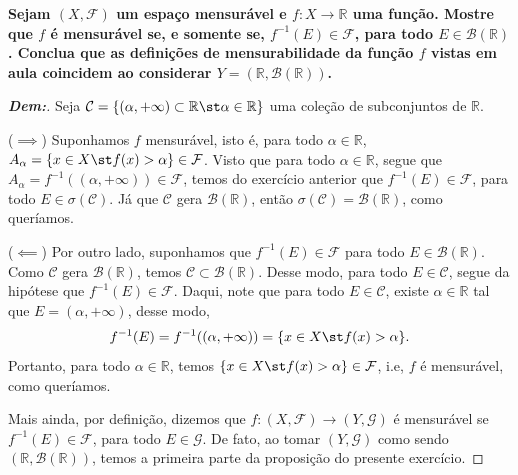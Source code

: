\biglinend
{}
\bigline 
\textbf{Sejam $(X, \mathcal F)$ um espaço mensurável e $f: X \rightarrow \mathbb R$ uma 
função. Mostre que $f$ é mensurável se, e somente se, $f^{-1}(E) \in \mathcal F$, 
para todo $E \in \mathcal B(\mathbb R)$. Conclua que as definições de mensurabilidade
da função $f$ vistas em aula coincidem ao considerar $Y=(\mathbb R, \mathcal B(\mathbb R))$.
}
\begin{proof}[\textbf{Dem:}]Seja  
  $\mathcal C=\{(\alpha, +\infty)\subset \mathbb R\st  \alpha \in \mathbb R\}$ uma coleção de 
  subconjuntos de $\mathbb R$. 

  \vspace{3mm}
($\implies$) Suponhamos $f$ mensurável, isto é,
  para todo $\alpha \in \mathbb R$, 
  $A_{\alpha} = \{x \in X\st  f(x) > \alpha\} \in \mathcal F$.  
   Visto que para todo $\alpha \in \mathbb R$, segue que 
  $A_\alpha = f^{-1}((\alpha, +\infty)) \in \mathcal F$, temos do exercício anterior que
  $f^{-1}(E) \in \mathcal F$, para todo $E \in \sigma(\mathcal C)$. Já que 
  $\mathcal C$ gera $\mathcal B(\mathbb R)$, então 
  $\sigma(\mathcal C) = \mathcal B (\mathbb R)$, como queríamos.

  
  ($\impliedby$) Por outro lado, suponhamos que $f^{-1}(E) \in \mathcal F$ para todo $E \in 
  \mathcal B(\mathbb R)$. Como $\mathcal C$ gera $\mathcal B(\mathbb R)$, temos 
  $\mathcal C \subset \mathcal B(\mathbb R)$. Desse modo, para todo $E \in \mathcal C$, 
  segue da hipótese que $f^{-1}(E) \in \mathcal F$. Daqui, note que para todo 
  $E \in \mathcal C$, existe $\alpha \in \mathbb R$ tal que $E = (\alpha, +\infty)$, 
  desse modo, 
  \begin{align*}
    f^{-1}(E) = f^{-1}((\alpha, +\infty)) = \{x\in X\st  f(x) > \alpha\}.
  \end{align*}
  Portanto, para todo $\alpha \in \mathbb R$, temos 
  $\{x \in X\st  f(x)>\alpha \} \in \mathcal F$, i.e, $f$ é mensurável, como queríamos.

  Mais ainda, por definição, dizemos que $f: (X,\mathcal F) \rightarrow (Y, \mathcal G)$ é
  mensurável se $f^{-1}(E) \in \mathcal F$, para todo $E \in \mathcal G$. De fato, ao tomar 
  $(Y, \mathcal G)$ como sendo $(\mathbb R, \mathcal B(\mathbb R))$, temos a primeira parte
  da proposição do presente exercício.
\end{proof}

